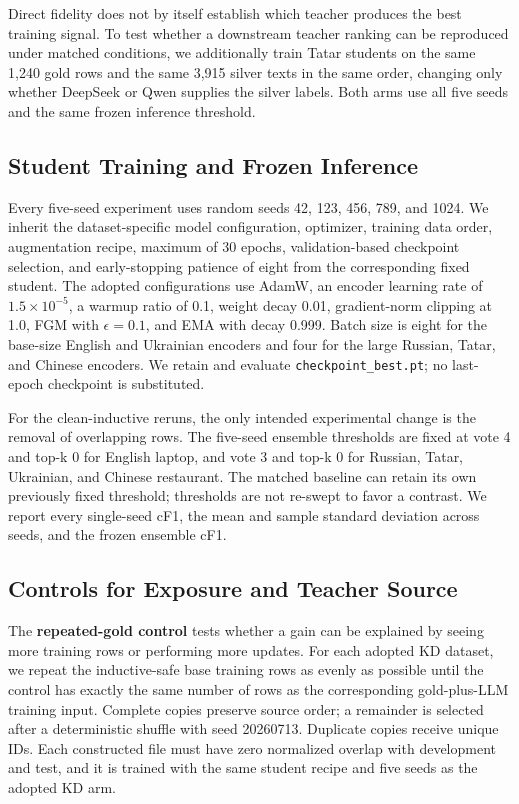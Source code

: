 Direct fidelity does not by itself establish which teacher produces the
best training signal. To test whether a downstream teacher ranking can
be reproduced under matched conditions, we additionally train Tatar
students on the same 1,240 gold rows and the same 3,915 silver texts in
the same order, changing only whether DeepSeek or Qwen supplies the
silver labels. Both arms use all five seeds and the same frozen
inference threshold.

\subsection{Student Training and Frozen
Inference}\label{student-training-and-frozen-inference}

Every five-seed experiment uses random seeds 42, 123, 456, 789, and
1024. We inherit the dataset-specific model configuration, optimizer,
training data order, augmentation recipe, maximum of 30 epochs,
validation-based checkpoint selection, and early-stopping patience of
eight from the corresponding fixed student. The adopted configurations
use AdamW, an encoder learning rate of \(1.5\times10^{-5}\), a warmup
ratio of 0.1, weight decay 0.01, gradient-norm clipping at 1.0, FGM with
\(\epsilon=0.1\), and EMA with decay 0.999. Batch size is eight for the
base-size English and Ukrainian encoders and four for the large Russian,
Tatar, and Chinese encoders. We retain and evaluate
\texttt{checkpoint\_best.pt}; no last-epoch checkpoint is substituted.

For the clean-inductive reruns, the only intended experimental change is
the removal of overlapping rows. The five-seed ensemble thresholds are
fixed at vote 4 and top-k 0 for English laptop, and vote 3 and top-k 0
for Russian, Tatar, Ukrainian, and Chinese restaurant. The matched
baseline can retain its own previously fixed threshold; thresholds are
not re-swept to favor a contrast. We report every single-seed cF1, the
mean and sample standard deviation across seeds, and the frozen ensemble
cF1.

\subsection{Controls for Exposure and Teacher
Source}\label{controls-for-exposure-and-teacher-source}

The \textbf{repeated-gold control} tests whether a gain can be explained
by seeing more training rows or performing more updates. For each
adopted KD dataset, we repeat the inductive-safe base training rows as
evenly as possible until the control has exactly the same number of rows
as the corresponding gold-plus-LLM training input. Complete copies
preserve source order; a remainder is selected after a deterministic
shuffle with seed 20260713. Duplicate copies receive unique IDs. Each
constructed file must have zero normalized overlap with development and
test, and it is trained with the same student recipe and five seeds as
the adopted KD arm.

